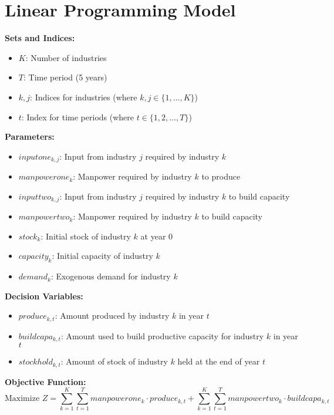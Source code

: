 \documentclass{article}
\begin{document}
\section*{Linear Programming Model}

\textbf{Sets and Indices:}
\begin{itemize}
    \item $K$: Number of industries
    \item $T$: Time period (5 years)
    \item $k, j$: Indices for industries (where $k, j \in \{1, \ldots, K\}$)
    \item $t$: Index for time periods (where $t \in \{1, 2, \ldots, T\}$)
\end{itemize}

\textbf{Parameters:}
\begin{itemize}
    \item $inputone_{k, j}$: Input from industry $j$ required by industry $k$
    \item $manpowerone_{k}$: Manpower required by industry $k$ to produce
    \item $inputtwo_{k, j}$: Input from industry $j$ required by industry $k$ to build capacity
    \item $manpowertwo_{k}$: Manpower required by industry $k$ to build capacity
    \item $stock_{k}$: Initial stock of industry $k$ at year 0
    \item $capacity_{k}$: Initial capacity of industry $k$
    \item $demand_{k}$: Exogenous demand for industry $k$
\end{itemize}

\textbf{Decision Variables:}
\begin{itemize}
    \item $produce_{k, t}$: Amount produced by industry $k$ in year $t$
    \item $buildcapa_{k, t}$: Amount used to build productive capacity for industry $k$ in year $t$
    \item $stockhold_{k, t}$: Amount of stock of industry $k$ held at the end of year $t$
\end{itemize}

\textbf{Objective Function:}
\[
\text{Maximize } Z = \sum_{k=1}^K \sum_{t=1}^T manpowerone_{k} \cdot produce_{k, t} + \sum_{k=1}^K \sum_{t=1}^T manpowertwo_{k} \cdot buildcapa_{k, t}
\]
\end{document}
